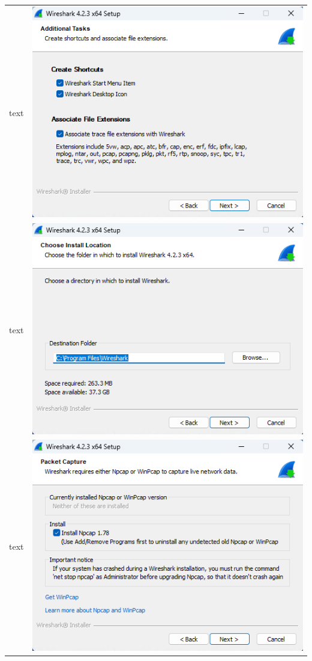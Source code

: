 \documentclass[11pt,a4paper]{report}
\begin{document}
\begin{tabular}{ l r }
            text & \includegraphics[scale=1.0]{wireshark06} \\
            text & \includegraphics[scale=1.0]{wireshark07} \\
            text & \includegraphics[scale=1.0]{wireshark08} \\

\end{tabular}
\end{document}
